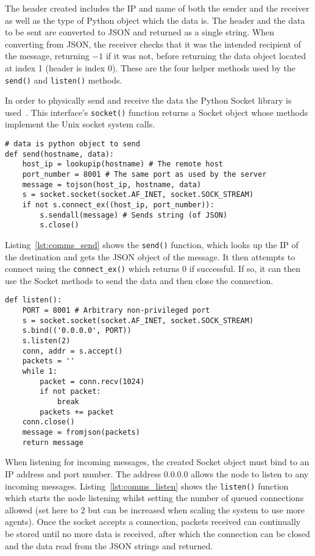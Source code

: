 The header created includes the IP and name of both the sender and the
receiver as well as the type of Python object which the data is. The header
and the data to be sent are converted to JSON and returned as a single
string. When converting from JSON, the receiver checks that it was the
intended recipient of the message, returning $-1$ if it was not, before
returning the data object located at index 1 (header is index 0). These
are the four helper methods used by the \verb|send()| and \verb|listen()|
methods.

In order to physically send and receive the data the Python Socket library
is used~\cite{socketServerDocs}. This interface's \verb|socket()| function
returns a Socket object whose methods implement the Unix socket system calls.

\begin{lstlisting}[caption={send() Function}, label={lst:comms_send}]
# data is python object to send
def send(hostname, data):
    host_ip = lookupip(hostname) # The remote host
    port_number = 8001 # The same port as used by the server
    message = tojson(host_ip, hostname, data)
    s = socket.socket(socket.AF_INET, socket.SOCK_STREAM)
    if not s.connect_ex((host_ip, port_number)):
        s.sendall(message) # Sends string (of JSON)
        s.close()
\end{lstlisting}

Listing~\ref{lst:comms_send} shows the \verb|send()| function, which looks up the IP of the destination and gets the JSON
object of the message. It then attempts to connect using the \verb|connect_ex()|
which returns 0 if successful. If so, it can then use the Socket methods to send
the data and then close the connection.

\begin{lstlisting}[caption={listen() Function}, label={lst:comms_=listen}]
def listen():
    PORT = 8001 # Arbitrary non-privileged port
    s = socket.socket(socket.AF_INET, socket.SOCK_STREAM)
    s.bind(('0.0.0.0', PORT))
    s.listen(2)
    conn, addr = s.accept()
    packets = ''
    while 1:
        packet = conn.recv(1024)
        if not packet:
            break
        packets += packet
    conn.close()
    message = fromjson(packets)
    return message
\end{lstlisting}

When listening for incoming messages, the created Socket object must bind to
an IP address and port number. The address 0.0.0.0 allows the node to listen
to any incoming messages. Listing~\ref{lst:comms_listen} shows the \verb|listen()| function which starts the node listening
whilst setting the number of queued connections allowed (set here to 2 but can
be increased when scaling the system to use more agents). Once the socket
accepts a connection, packets received can continually be stored
until no more data is received, after which the connection can be closed and
the data read from the JSON strings and returned.


